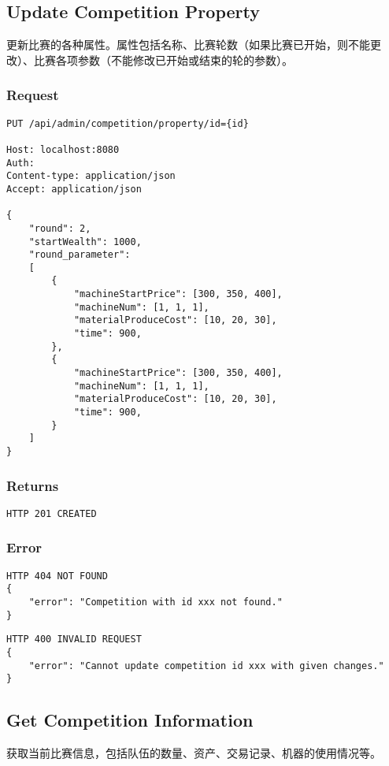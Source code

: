 \documentclass{article}
\begin{document}
\subsection{Update Competition Property}

更新比赛的各种属性。属性包括名称、比赛轮数（如果比赛已开始，则不能更改）、比赛各项参数（不能修改已开始或结束的轮的参数）。

\subsubsection*{Request}
\begin{lstlisting}
PUT /api/admin/competition/property/id={id}

Host: localhost:8080
Auth:
Content-type: application/json
Accept: application/json

{
    "round": 2,
    "startWealth": 1000,
    "round_parameter":
    [
        {
            "machineStartPrice": [300, 350, 400],
            "machineNum": [1, 1, 1],
            "materialProduceCost": [10, 20, 30],
            "time": 900,
        },
        {
            "machineStartPrice": [300, 350, 400],
            "machineNum": [1, 1, 1],
            "materialProduceCost": [10, 20, 30],
            "time": 900,
        }
    ]
}
\end{lstlisting}

\subsubsection*{Returns}
\begin{lstlisting}
HTTP 201 CREATED
\end{lstlisting}

\subsubsection*{Error}
\begin{lstlisting}
HTTP 404 NOT FOUND
{
    "error": "Competition with id xxx not found."
}
\end{lstlisting}

\begin{lstlisting}
HTTP 400 INVALID REQUEST
{
    "error": "Cannot update competition id xxx with given changes."
}
\end{lstlisting}

\subsection{Get Competition Information}
获取当前比赛信息，包括队伍的数量、资产、交易记录、机器的使用情况等。
\end{document}
